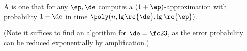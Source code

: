 \begin{df}
A  is one that for any $\ep,\de$ computes a $(1+\ep)$-approximation with probability $1-\de$ in time $\poly(n,\lg \rc{\de},\lg \rc{\ep})$.
\end{df}
(Note it suffices to find an algorithm for $\de=\fc23$, as the error probability can be reduced exponentially by amplification.)
